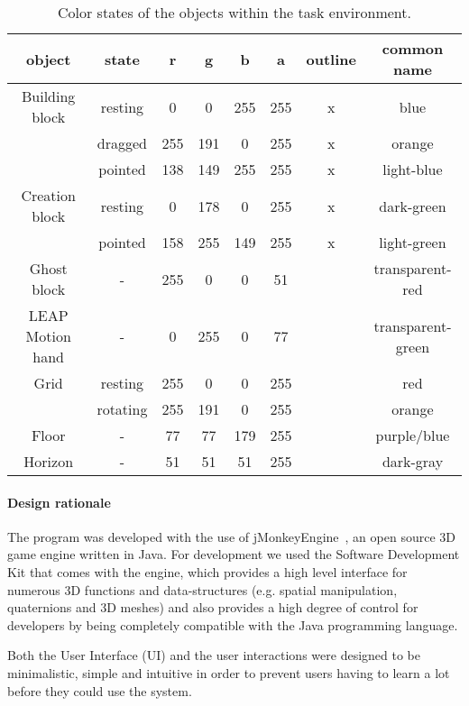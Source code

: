 \begin{table}[H]
\centering
\begin{tabular}{|c|c|c|c|c|c|c|c|}
\hline
\textbf{object} & \textbf{state} & \textbf{r} & \textbf{g} & \textbf{b} & \textbf{a} & \textbf{outline} & \textbf{common name}\\ \hline\hline
Building block & resting & 0 & 0 & 255 & 255 & x & blue \\ 
 & dragged & 255 & 191 & 0 & 255 & x & orange \\ 
 & pointed & 138 & 149 & 255 & 255 & x & light-blue \\ \hline 
Creation block & resting & 0 & 178 & 0 & 255 & x & dark-green \\ 
 & pointed & 158 & 255 & 149 & 255 & x & light-green\\ \hline 
Ghost block & - & 255 & 0 & 0 & 51 & & transparent-red \\ \hline
LEAP Motion hand & - & 0 & 255 & 0 & 77 & & transparent-green  \\ \hline 
Grid & resting & 255 & 0 & 0 & 255 & & red \\ 
 & rotating & 255 & 191 & 0 & 255 & & orange \\ \hline 
Floor & - & 77 & 77 & 179 & 255 & & purple/blue \\ \hline 
Horizon & - & 51 & 51 & 51 & 255 & & dark-gray \\ \hline 
\end{tabular}
\caption{\label{tab:colors} Color states of the objects within the task environment.}
\end{table}

\paragraph{Design rationale}
The program was developed with the use of jMonkeyEngine~\cite{Irene:2012}, an open source 3D game engine written in Java. For development we used the Software Development Kit that comes with the engine, which provides a high level interface for numerous 3D functions and data-structures (e.g. spatial manipulation, quaternions and 3D meshes) and also provides a high degree of control for developers by being completely compatible with the Java programming language. 

Both the User Interface (UI) and the user interactions were designed to be minimalistic, simple and intuitive in order to prevent users having to learn a lot before they could use the system. 
